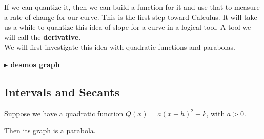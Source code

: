 \documentclass{ximera}
\begin{document}
If we can quantize it, then we can build a function for it and use that to measure a rate of change for our curve. This is the first step toward Calculus. It will take us a while to quantize this idea of slope for a curve in a logical tool. A tool we will call the \textbf{derivative}.\\

We will first investigate this idea with quadratic functions and parabolas. 








\textbf{\textcolor{blue!55!black}{$\blacktriangleright$ desmos graph}} 
\begin{center}
\end{center}


































\subsection*{Intervals and Secants}



Suppose we have a quadratic function $Q(x) = a (x - h)^2 + k$, with $a > 0$. 


Then its graph is a parabola.
\end{document}
